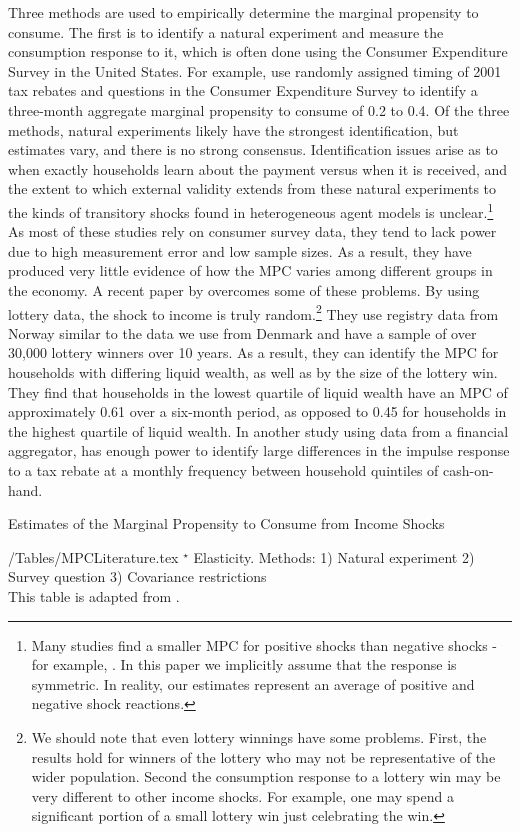 \documentclass[titlepage]{\econtex}\newcommand{\texname}{ConsumptionHeterogeneity}
\begin{document}
Three methods are used to empirically determine the marginal propensity to consume. The first is to identify a natural experiment and measure the consumption response to it, which is often done using the Consumer Expenditure Survey in the United States. For example, \cite{johnson_household_2006} use randomly assigned timing of 2001 tax rebates and questions in the Consumer Expenditure Survey to identify a three-month aggregate marginal propensity to consume of 0.2 to 0.4. Of the three methods, natural experiments likely have the strongest identification, but estimates vary, and there is no strong consensus. Identification issues arise as to when exactly households learn about the payment versus when it is received, and the extent to which external validity extends from these natural experiments to the kinds of transitory shocks found in heterogeneous agent models is unclear.\footnote{Many studies find a smaller MPC for positive shocks than negative shocks - for example, \cite{bunn_consumption_2018}. In this paper we implicitly assume that the response is symmetric. In reality, our estimates represent an average of positive and negative shock reactions.} As most of these studies rely on consumer survey data, they tend to lack power due to high measurement error and low sample sizes. As a result, they have produced very little evidence of how the MPC varies among different groups in the economy. A recent paper by \cite{fagereng_mpc_2016} overcomes some of these problems. By using lottery data, the shock to income is truly random.\footnote{We should note that even lottery winnings have some problems. First, the results hold for winners of the lottery who may not be representative of the wider population. Second the consumption response to a lottery win may be very different to other income shocks. For example, one may spend a significant portion of a small lottery win just celebrating the win.} They use registry data from Norway similar to the data we use from Denmark and have a sample of over 30,000 lottery winners over 10 years. As a result, they can identify the MPC for households with differing liquid wealth, as well as by the size of the lottery win. They find that households in the lowest quartile of liquid wealth have an MPC of approximately 0.61 over a six-month period, as opposed to 0.45 for households in the highest quartile of liquid wealth. In another study using data from a financial aggregator, \cite{gelman_what_2016} has enough power to identify large differences in the impulse response to a tax rebate at a monthly frequency between household quintiles of cash-on-hand.
\begin{sidewaystable} \small
	\caption{Estimates of the Marginal Propensity to Consume from Income Shocks}
	\label{table:MPCLiterature}
	\begin{minipage}{\textwidth}
		\econtexRoot/Tables/MPCLiterature.tex 
		\footnotesize{$^{\star}$ Elasticity. Methods: 1) Natural experiment 2) Survey question 3) Covariance restrictions \\
		This table is adapted from \cite{carroll_distribution_2017}.}
	\end{minipage}
\end{sidewaystable}
\end{document}
